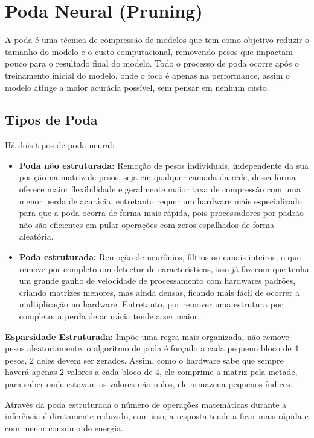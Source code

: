 \section{Poda Neural (Pruning)}\label{sec:pruning}
A poda é uma técnica de compressão de modelos que tem como objetivo reduzir o tamanho do modelo e o custo computacional, removendo pesos que impactam pouco para o resultado final do modelo.
Todo o processo de poda ocorre após o treinamento inicial do modelo, onde o foco é apenas na performance, assim o modelo atinge a maior acurácia possível, sem pensar em nenhum custo.

\subsection{Tipos de Poda}
Há dois tipos de poda neural:
\begin{itemize}
    \item \textbf{Poda não estruturada:} Remoção de pesos individuais, independente da sua posição na matriz de pesos, seja em qualquer camada da rede, dessa forma oferece maior flexibilidade e geralmente maior taxa de compressão com uma menor perda de acurácia, entretanto requer um hardware mais especializado para que a poda ocorra de forma mais rápida, pois processadores por padrão não são eficientes em pular operações com zeros espalhados de forma aleatória.
    \item \textbf{Poda estruturada:} Remoção de neurônios, filtros ou canais inteiros, o que remove por completo um detector de características, isso já faz com que tenha um grande ganho de velocidade de processamento com hardwares padrões, criando matrizes menores, mas ainda densas, ficando mais fácil de ocorrer a multiplicação no hardware. Entretanto, por remover uma estrutura por completo, a perda de acurácia tende a ser maior.
\end{itemize}

\textbf{Esparsidade Estruturada}: Impõe uma regra mais organizada, não remove pesos aleatoriamente, o algoritmo de poda é forçado a cada pequeno bloco de 4 pesos, 2 deles devem ser zerados. Assim, como o hardware sabe que sempre haverá apenas 2 valores a cada bloco de 4, ele comprime a matriz pela metade, para saber onde estavam os valores não nulos, ele armazena pequenos índices.

Através da poda estruturada o número de operações matemáticas durante a inferência é diretamente reduzido, com isso, a resposta tende a ficar mais rápida e com menor consumo de energia.

